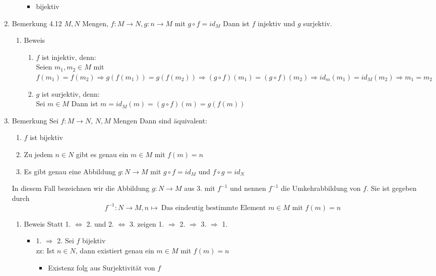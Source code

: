 \documentclass[11pt]{article}
\begin{document}
\begin{enumerate}
\begin{enumerate}
\begin{itemize}
\item bijektiv
\end{itemize}
\end{enumerate}
\item Bemerkung 4.12
\label{sec-2-6-7-5}
$M,N$ Mengen, $f:M\to N, g:n\to M$ mit $g\circ f = id_M$
Dann ist $f$ injektiv und $g$ surjektiv.
\begin{enumerate}
\item Beweis
\label{sec-2-6-7-5-1}
\begin{enumerate}
\item $f$ ist injektiv, denn: \\
         Seien $m_1, m_2 \in M$ mit $f(m_1) = f(m_2) \Rightarrow g(f(m_1)) = g(f(m_2)) \Rightarrow (g\circ f)(m_1) = (g\circ f)(m_2) \Rightarrow id_m(m_1) = id_M(m_2)\Rightarrow m_1 = m_2$
\item $g$ ist surjektiv, denn: \\
         Sei $m\in M$ Dann ist $m=id_M(m) = (g\circ f)(m) = g(f(m))$
\end{enumerate}
\end{enumerate}
\item Bemerkung
\label{sec-2-6-7-6}
Sei $f:M\to N$, $N,M$ Mengen
Dann sind äquivalent:
\begin{enumerate}
\item $f$ ist bijektiv
\item Zu jedem $n\in N$ gibt es genau ein $m\in M$ mit $f(m) = n$
\item Es gibt genau eine Abbildung $g:N\to M$ mit $g\circ f = id_M$ und $f\circ g = id_N$
\end{enumerate}
In diesem Fall bezeichnen wir die Abbildung $g:N\to M$ aus 3. mit $f^{-1}$ und nennen $f^{-1}$ die Umkehrabbildung von $f$. Sie ist gegeben durch
\[f^{-1} : N\to M, n\mapsto~\text{Das eindeutig bestimmte Element $m\in M$ mit $f(m) = n$}\]
\begin{enumerate}
\item Beweis
\label{sec-2-6-7-6-1}
Statt 1. $\Leftrightarrow$ 2. und 2. $\Leftrightarrow$ 3. zeigen 1. $\Rightarrow$ 2. $\Rightarrow$ 3. $\Rightarrow$ 1.
\begin{itemize}
\item 1. $\Rightarrow$ 2. Sei $f$ bijektiv \\
        zz: Ist $n\in N$, dann existiert genau ein $m\in M$ mit $f(m) = n$ \\
\begin{itemize}
\item Existenz folg aus Surjektivität von $f$

\end{itemize}
\end{itemize}
\end{enumerate}
\end{enumerate}
\end{document}
